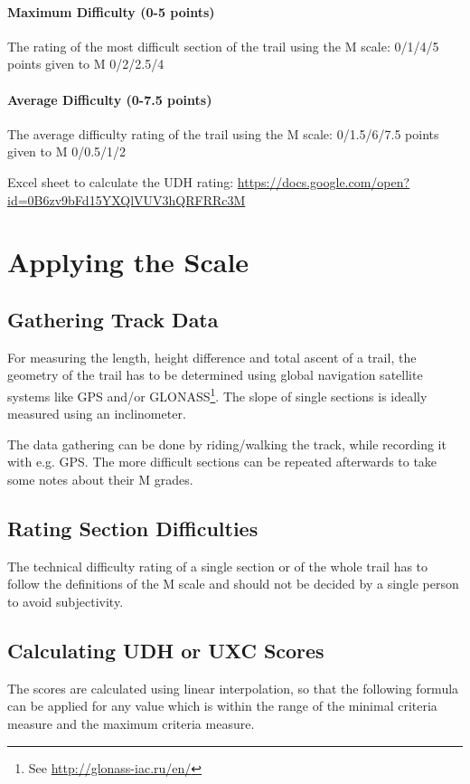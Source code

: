 \documentclass[a4paper,oneside]{scrartcl}
\begin{document}
\paragraph{Maximum Difficulty (0-5 points)}
The rating of the most difficult section of the trail using the M scale: 0/1/4/5
points given to M 0/2/2.5/4

\paragraph{Average Difficulty (0-7.5 points)} 
The average difficulty rating of the trail using the M scale: 0/1.5/6/7.5 points
given to M 0/0.5/1/2

Excel sheet to calculate the UDH rating: \url{https://docs.google.com/open?id=0B6zv9bFd15YXQlVUV3hQRFRRc3M}


\section{Applying the Scale}

\subsection{Gathering Track Data}
For measuring the length, height difference and total ascent of a trail, the
geometry of the trail has to be determined using global navigation satellite
systems like GPS and/or GLONASS\footnote{See \url{http://glonass-iac.ru/en/}}.
The slope of single sections is ideally measured using an inclinometer.

The data gathering can be done by riding/walking the track, while recording it
with e.g. GPS. The more difficult sections can be repeated afterwards to take
some notes about their M grades.

\subsection{Rating Section Difficulties}
The technical difficulty rating of a single section or of the whole trail has to
follow the definitions of the M scale and should not be decided by a single
person to avoid subjectivity.


\subsection{Calculating UDH or UXC Scores}
The scores are calculated using linear interpolation, so that the following formula can be applied for any value which is
within the range of the minimal criteria measure and the maximum criteria measure.
\end{document}
